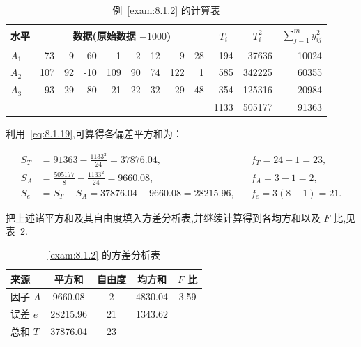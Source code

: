 \begin{table}[htbp]
  \centering
  \caption{例~\ref{exam:8.1.2} 的计算表}
    \begin{tabular}{rrrrrrrrrrrr}
    \toprule
    \multicolumn{1}{l}{水平} & \multicolumn{8}{c}{数据(原始数据 $-1000$)}                             & \multicolumn{1}{c}{$T_i$} & \multicolumn{1}{c}{$T_i^2$} & \multicolumn{1}{c}{$\sum_{j=1}^{m} y_{ij}^2$} \\
    \midrule
    \multicolumn{1}{l}{$A_1$} & 73    & 9     & 60    & 1     & 2     & 12    & 9     & 28    & 194   & 37636 & 10024 \\
    \multicolumn{1}{l}{$A_2$} & 107   & 92    & -10   & 109   & 90    & 74    & 122   & 1     & 585   & 342225 & 60355 \\
    \multicolumn{1}{l}{$A_3$} & 93    & 29    & 80    & 21    & 22    & 32    & 29    & 48    & 354   & 125316 & 20984 \\
    \midrule
          &       &       &       &       &       &       &       &       & 1133  & 505177 & 91363 \\
    \bottomrule
    \end{tabular}%
  \label{tab:8.1.4}%
\end{table}%

利用~\eqref{eq:8.1.19},可算得各偏差平方和为：

\begin{align*}
S_T & = 91363 - \frac{1133^2}{24} = 37876.04, && f_T = 24-1=23,\\
S_A &= \frac{505177}{8} - \frac{1133^2}{24} = 9660.08, && f_A = 3 - 1 = 2,\\
S_e &= S_{T} - S_A = 37876.04 - 9660.08 = 28215.96, && f_{e} = 3(8-1)=21.
\end{align*}

把上述诸平方和及其自由度填入方差分析表,并继续计算得到各均方和以及 $F$ 比,见表~\ref{tab:8.1.5}.

\begin{table}[htbp]
  \centering
  \caption{\ref{exam:8.1.2} 的方差分析表}
    \begin{tabular}{lcccc}
    \toprule
    来源    & 平方和   & 自由度   & 均方和   & $F$ 比 \\
    \midrule
    因子 $A$  & 9660.08 & 2     & 4830.04 & 3.59 \\
    误差 $e$  & 28215.96 & 21    & 1343.62 &  \\
    总和 $T$  & 37876.04 & 23    &       &  \\
    \bottomrule
    \end{tabular}%
  \label{tab:8.1.5}%
\end{table}%



